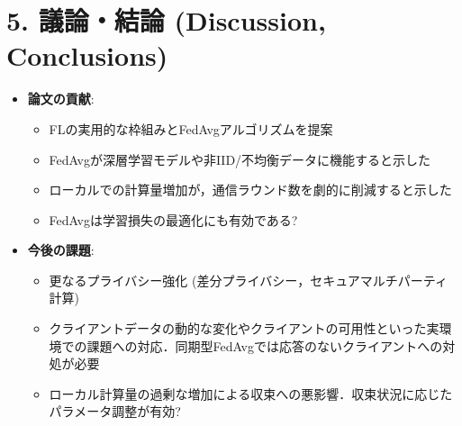 \documentclass[unicode,12pt,aspectratio=169, dvipdfmx]{beamer}
\begin{document}
\section{5. 議論・結論 (Discussion, Conclusions)}
\begin{frame}{\insertsectionhead}
\begin{itemize}
    \item \textbf{論文の貢献}:
    \begin{itemize}
        \item FLの実用的な枠組みとFedAvgアルゴリズムを提案
        \item FedAvgが深層学習モデルや非IID/不均衡データに機能すると示した
        \item ローカルでの計算量増加が，通信ラウンド数を劇的に削減すると示した
        \item FedAvgは学習損失の最適化にも有効である?
    \end{itemize}
    \item \textbf{今後の課題}:
    \begin{itemize}
        \item 更なるプライバシー強化 (差分プライバシー，セキュアマルチパーティ計算)
        \item クライアントデータの動的な変化やクライアントの可用性といった実環境での課題への対応．同期型FedAvgでは応答のないクライアントへの対処が必要
        \item ローカル計算量の過剰な増加による収束への悪影響．収束状況に応じたパラメータ調整が有効?
    \end{itemize}
\end{itemize}
\end{frame}
\end{document}
